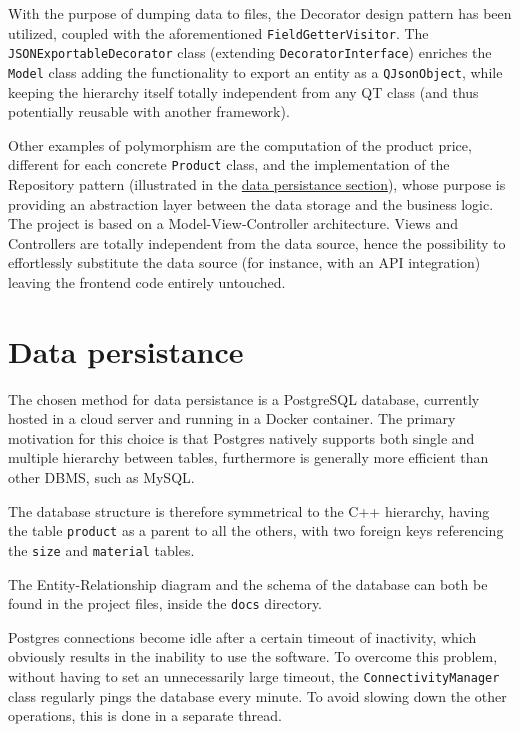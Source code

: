 \documentclass[10pt]{article}
\begin{document}
With the purpose of dumping data to files, the Decorator design pattern has
been utilized, coupled with the aforementioned \texttt{FieldGetterVisitor}. The
\texttt{JSONExportableDecorator} class (extending \texttt{DecoratorInterface})
enriches the \texttt{Model} class adding the functionality to export an entity
as a \texttt{QJsonObject}, while keeping the hierarchy itself totally
independent from any QT class (and thus potentially reusable with another
framework).

Other examples of polymorphism are the computation of the product price,
different for each concrete \texttt{Product} class, and the implementation of
the Repository pattern (illustrated in the \hyperref[sec:dataPersistance]{data
    persistance section}), whose purpose is providing an abstraction layer between
the data storage and the business logic. The project is based on a
Model-View-Controller architecture. Views and Controllers are totally
independent from the data source, hence the possibility to effortlessly
substitute the data source (for instance, with an API integration) leaving the
frontend code entirely untouched.

\section{Data persistance}
\label{sec:dataPersistance}
The chosen method for data persistance is a PostgreSQL database, currently
hosted in a cloud server and running in a Docker container. The primary
motivation for this choice is that Postgres natively supports both single and
multiple hierarchy between tables, furthermore is generally more efficient than
other DBMS, such as MySQL.

The database structure is therefore symmetrical to the C++ hierarchy, having
the table \texttt{product} as a parent to all the others, with two foreign keys
referencing the \texttt{size} and \texttt{material} tables.

The Entity-Relationship diagram and the schema of the database can both be
found in the project files, inside the \texttt{docs} directory.

Postgres connections become idle after a certain timeout of inactivity, which
obviously results in the inability to use the software. To overcome this
problem, without having to set an unnecessarily large timeout, the
\texttt{ConnectivityManager} class regularly pings the database every minute.
To avoid slowing down the other operations, this is done in a separate thread.
\end{document}
